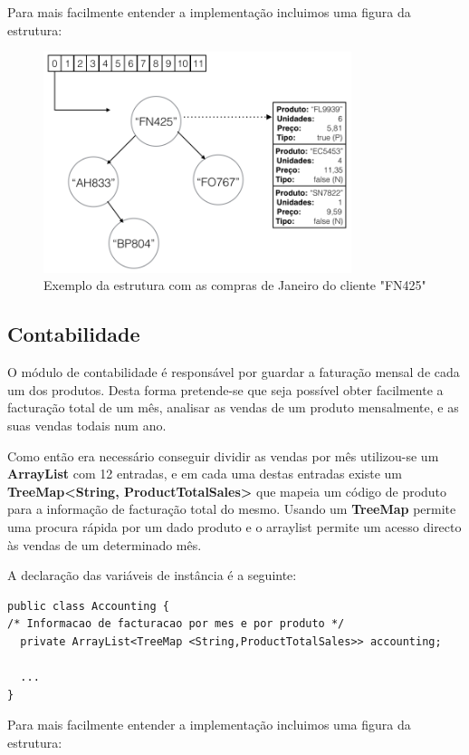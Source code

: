 \documentclass[10pt] {article}
\begin{document}
Para mais facilmente entender a implementação incluimos uma figura da estrutura:

\begin{figure}[ht!]
\centering
\includegraphics[width=90mm]{sales.png}
\caption{Exemplo da estrutura com as compras de Janeiro do cliente "FN425"}
\label{fig:sales}
\end{figure}

\subsection{Contabilidade}

O módulo de contabilidade é responsável por guardar a faturação mensal de cada um dos produtos.
Desta forma pretende-se que seja possível obter facilmente a facturação total de um mês, analisar as vendas de um produto mensalmente, e as suas vendas todais num ano.

Como então era necessário conseguir dividir as vendas por mês utilizou-se um \textbf{ArrayList} com 12 entradas, e
em cada uma destas entradas existe um \textbf{TreeMap\textless String, ProductTotalSales\textgreater} que mapeia um código de produto para a informação de facturação total do mesmo. Usando um \textbf{TreeMap} permite uma
procura rápida por um dado produto e o arraylist permite um acesso directo às vendas de um determinado mês.

A declaração das variáveis de instância é a seguinte:

\begin{lstlisting}
public class Accounting {
/* Informacao de facturacao por mes e por produto */
  private ArrayList<TreeMap <String,ProductTotalSales>> accounting;

  ...
}

\end{lstlisting}

Para mais facilmente entender a implementação incluimos uma figura da estrutura:
\end{document}
